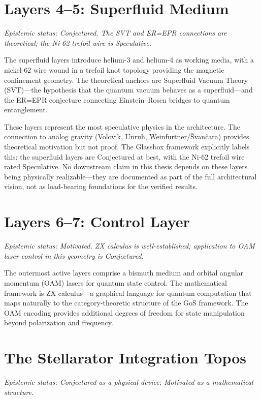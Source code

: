 \documentclass[12pt,letterpaper]{report}
\newcommand{\epistemic}[1]{%
  \par\vspace{4pt}%
  {\small\itshape\color{gray} Epistemic status: #1}%
  \par\vspace{4pt}%
}
\begin{document}
\section{Layers 4--5: Superfluid Medium}

\epistemic{Conjectured. The SVT and ER=EPR connections are theoretical; the Ni-62 trefoil wire is Speculative.}

The superfluid layers introduce helium-3 and helium-4 as working media, with a nickel-62 wire wound in a trefoil knot topology providing the magnetic confinement geometry. The theoretical anchors are Superfluid Vacuum Theory (SVT)---the hypothesis that the quantum vacuum behaves as a superfluid---and the ER=EPR conjecture connecting Einstein--Rosen bridges to quantum entanglement.

These layers represent the most speculative physics in the architecture. The connection to analog gravity (Volovik, Unruh, Weinfurtner/\v{S}van\v{c}ara) provides theoretical motivation but not proof. The Glassbox framework explicitly labels this: the superfluid layers are Conjectured at best, with the Ni-62 trefoil wire rated Speculative. No downstream claim in this thesis depends on these layers being physically realizable---they are documented as part of the full architectural vision, not as load-bearing foundations for the verified results.

\section{Layers 6--7: Control Layer}

\epistemic{Motivated. ZX calculus is well-established; application to OAM laser control in this geometry is Conjectured.}

The outermost active layers comprise a bismuth medium and orbital angular momentum (OAM) lasers for quantum state control. The mathematical framework is ZX calculus---a graphical language for quantum computation that maps naturally to the category-theoretic structure of the GoS framework. The OAM encoding provides additional degrees of freedom for state manipulation beyond polarization and frequency.

\section{The Stellarator Integration Topos}

\epistemic{Conjectured as a physical device; Motivated as a mathematical structure.}
\end{document}
